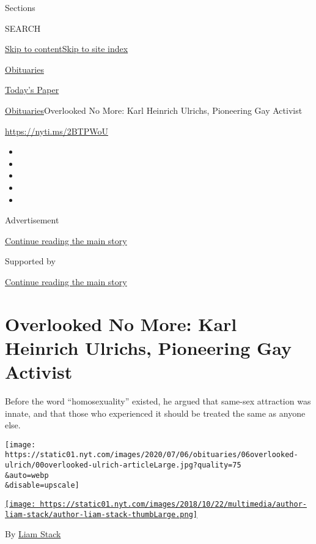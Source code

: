 Sections

SEARCH

\protect\hyperlink{site-content}{Skip to
content}\protect\hyperlink{site-index}{Skip to site index}

\href{https://www.nytimes.com/section/obituaries}{Obituaries}

\href{https://myaccount.nytimes.com/auth/login?response_type=cookie\&client_id=vi}{}

\href{https://www.nytimes.com/section/todayspaper}{Today's Paper}

\href{/section/obituaries}{Obituaries}\textbar{}Overlooked No More: Karl
Heinrich Ulrichs, Pioneering Gay Activist

\url{https://nyti.ms/2BTPWoU}

\begin{itemize}
\item
\item
\item
\item
\item
\end{itemize}

Advertisement

\protect\hyperlink{after-top}{Continue reading the main story}

Supported by

\protect\hyperlink{after-sponsor}{Continue reading the main story}

\hypertarget{overlooked-no-more-karl-heinrich-ulrichs-pioneering-gay-activist}{%
\section{Overlooked No More: Karl Heinrich Ulrichs, Pioneering Gay
Activist}\label{overlooked-no-more-karl-heinrich-ulrichs-pioneering-gay-activist}}

Before the word ``homosexuality'' existed, he argued that same-sex
attraction was innate, and that those who experienced it should be
treated the same as anyone else.

\texttt{[image: https://static01.nyt.com/images/2020/07/06/obituaries/06overlooked-ulrich/00overlooked-ulrich-articleLarge.jpg?quality=75\\\&auto=webp\\\&disable=upscale]}

\href{https://www.nytimes.com/by/liam-stack}{\texttt{[image: https://static01.nyt.com/images/2018/10/22/multimedia/author-liam-stack/author-liam-stack-thumbLarge.png]}}

By \href{https://www.nytimes.com/by/liam-stack}{Liam Stack}

